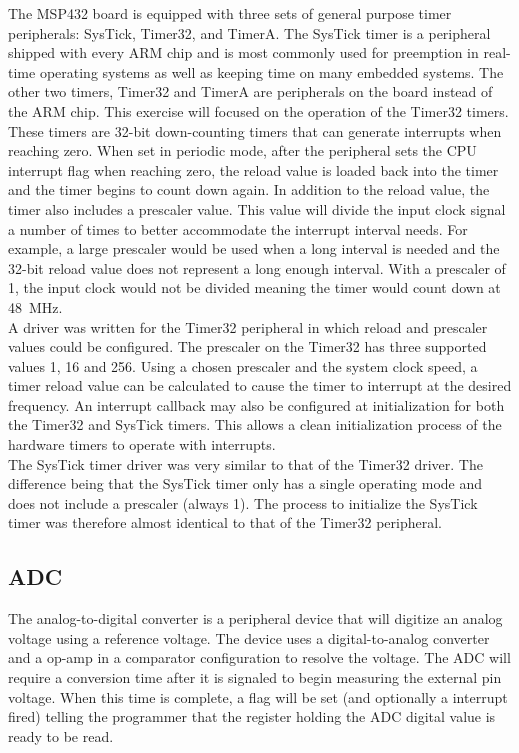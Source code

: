 \documentclass[CMPE]{../KGCOEReport}
\begin{document}
	The MSP432 board is equipped with three sets of general purpose timer peripherals:
	SysTick, Timer32, and TimerA.
	The SysTick timer is a peripheral shipped with every ARM chip and is most commonly
	used for preemption in real-time operating systems as well as keeping time on
	many embedded systems. The other two timers, Timer32 and TimerA are peripherals on
	the board instead of the ARM chip. This exercise will focused on the operation of the
	Timer32 timers. These timers are 32-bit down-counting timers that can generate
	interrupts when reaching zero. When set in periodic mode, after the peripheral sets
	the CPU interrupt flag when reaching zero, the reload value is loaded back into the
	timer and the timer begins to count down again. In addition to the reload value, the
	timer also includes a prescaler value. This value will divide the input clock signal
	a number of times to better accommodate the interrupt interval needs. For example,
	a large prescaler would be used when a long interval is needed and the 32-bit
	reload value does not represent a long enough interval. With a prescaler of 1, the
	input clock would not be divided meaning the timer would count down at \SI{48}{\mega\Hz}.
	\\

	A driver was written for the Timer32 peripheral in which reload and prescaler
	values could be configured. The prescaler on the Timer32 has three supported values
	1, 16 and 256.
	Using a chosen prescaler and the system clock speed, a timer reload value can be
	calculated to cause the timer to interrupt at the desired frequency. An interrupt
	callback may also be configured at initialization for both the Timer32 and SysTick
	timers. This allows a clean initialization process of the hardware timers to operate
	with interrupts.\\

	The SysTick timer driver was very similar to that of the Timer32 driver. The
	difference being that the SysTick timer only has a single operating mode and does
	not include a prescaler (always 1). The process to initialize the SysTick timer
	was therefore almost identical to that of the Timer32 peripheral.

    \subsection*{ADC}

	The analog-to-digital converter is a peripheral device that will digitize an analog
	voltage using a reference voltage. The device uses a digital-to-analog converter
	and a op-amp in a comparator configuration to resolve the voltage. The ADC will
	require a conversion time after it is signaled to begin measuring the external pin
	voltage. When this time is complete, a flag will be set (and optionally a
	interrupt fired) telling the programmer that the register holding the ADC digital
	value is ready to be read.\\
\end{document}
